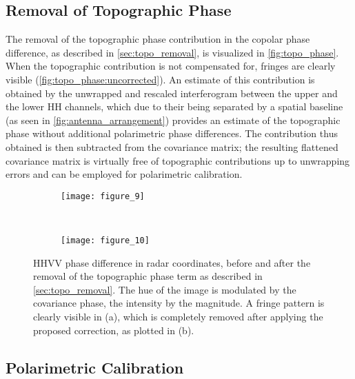 \subsection{Removal of Topographic Phase}\label{sec:topo_removal}
The removal of the topographic phase contribution in the copolar phase difference, as described in \autoref{sec:topo_removal}, is visualized in  \autoref{fig:topo_phase}. When the topographic contribution is not compensated for, fringes are clearly visible (\autoref{fig:topo_phase:uncorrected}). An estimate of this contribution is obtained by the unwrapped and rescaled interferogram between the upper and the lower HH channels, which due to their being separated by a spatial baseline (as seen in \autoref{fig:antenna_arrangement}) provides an estimate of the topographic phase without additional polarimetric phase differences. The contribution thus obtained is then subtracted from the covariance matrix; the resulting flattened covariance matrix is virtually free of topographic contributions up to unwrapping errors and can be employed for polarimetric calibration.
\begin{figure*}[hb]
	\centering
	\begin{subfigure}[t]{\textwidth}
	\centering
	\texttt{[image: figure\_9]}
	\label{fig:topo_phase:uncorrected}
	\end{subfigure}\\
	\begin{subfigure}[t]{\textwidth}
	\centering
	\texttt{[image: figure\_10]}
	\label{fig:topo_phase:corrected}
	\end{subfigure}
	\caption{HHVV phase difference in radar coordinates, before and after the removal of the topographic phase term as described in \autoref{sec:topo_removal}. The hue of the image is modulated by the covariance phase, the intensity by the magnitude. A fringe pattern is clearly visible in (a), which is completely removed after applying the proposed correction, as plotted in (b).}
	\label{fig:topo_phase}
\end{figure*}
\subsection{Polarimetric Calibration}\label{sec:res_polcal}

